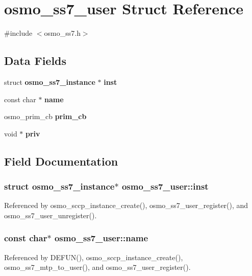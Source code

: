 \section{osmo\+\_\+ss7\+\_\+user Struct Reference}
\label{structosmo__ss7__user}


{\ttfamily \#include $<$osmo\+\_\+ss7.\+h$>$}

\subsection*{Data Fields}
\begin{DoxyCompactItemize}
\item 
struct {\bf osmo\+\_\+ss7\+\_\+instance} $\ast$ {\bf inst}
\item 
const char $\ast$ {\bf name}
\item 
osmo\+\_\+prim\+\_\+cb {\bf prim\+\_\+cb}
\item 
void $\ast$ {\bf priv}
\end{DoxyCompactItemize}


\subsection{Field Documentation}
\subsubsection[{inst}]{\setlength{\rightskip}{0pt plus 5cm}struct {\bf osmo\+\_\+ss7\+\_\+instance}$\ast$ osmo\+\_\+ss7\+\_\+user\+::inst}\label{structosmo__ss7__user_afd0f189e469aaa190c31c7986091fdc4}


Referenced by osmo\+\_\+sccp\+\_\+instance\+\_\+create(), osmo\+\_\+ss7\+\_\+user\+\_\+register(), and osmo\+\_\+ss7\+\_\+user\+\_\+unregister().

\subsubsection[{name}]{\setlength{\rightskip}{0pt plus 5cm}const char$\ast$ osmo\+\_\+ss7\+\_\+user\+::name}\label{structosmo__ss7__user_a0ae7a3b3963b10eb0f3f5e7a38c277aa}


Referenced by D\+E\+F\+U\+N(), osmo\+\_\+sccp\+\_\+instance\+\_\+create(), osmo\+\_\+ss7\+\_\+mtp\+\_\+to\+\_\+user(), and osmo\+\_\+ss7\+\_\+user\+\_\+register().

